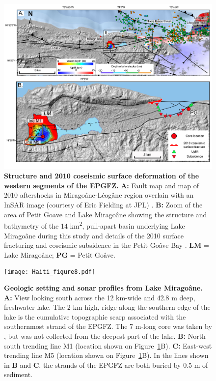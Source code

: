 \documentclass[linenumbers,draft]{agujournal}
\begin{document}
\begin{figure}
\centering
\includegraphics[width=\textwidth]{Haiti_figure7}
\caption{\textbf{Structure and 2010 coseismic surface deformation of the western segments of the EPGFZ.} \textbf{A:} Fault map \citep{prentice2010seismic,cowgill2012interactive} and map of 2010 aftershocks \citep{douilly2013crustal} in Mirago\^ane-L\'eog\^ane region overlain with an InSAR image (courtesy of Eric Fielding at JPL) \citep{hayes2010complex}. \textbf{B:} Zoom of the area of Petit Goave and Lake Mirago\^ane showing the structure and bathymetry of the 14 km\textsuperscript{2}, pull-apart basin underlying Lake Mirago\^ane during this study and details of the 2010 surface fracturing and coseismic subsidence in the Petit Go\^ave Bay \citep{prentice2010seismic,hornbach2010high}. \textbf{LM} = Lake Mirago\^ane; \textbf{PG} = Petit Go\^ave.}
\label{figure7}
\end{figure}

\begin{figure}
\centering
\texttt{[image: Haiti\_figure8.pdf]}
\caption{\textbf{Geologic setting and sonar profiles from Lake Mirago\^ane.} \textbf{A:} View looking south across the 12 km-wide and 42.8 m deep, freshwater lake. The 2 km-high, ridge along the southern edge of the lake is the cumulative topographic scarp associated with the southernmost strand of the EPGFZ. The 7 m-long core was taken by \citet{higuera199910}, but was not collected from the deepest part of the lake. \textbf{B:} North-south trending line M1 (location shown on Figure~\ref{figure7}B). \textbf{C:} East-west trending line M5 (location shown on Figure~\ref{figure7}B). In the lines shown in \textbf{B} and \textbf{C}, the strands of the EPGFZ are both buried by 0.5 m of sediment.}
\label{figure8}
\end{figure}
\end{document}
